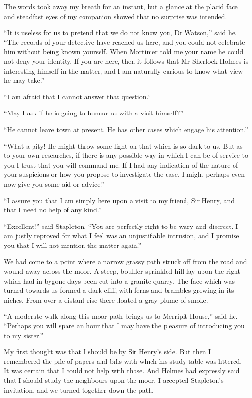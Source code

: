 \documentclass[paper=5.5in:8.5in,BCOR=7mm,twoside,DIV=calc,12pt,usegeometry,openany,chapterprefix,endperiod]{scrbook} %
\begin{document}
The words took away my breath for an instant, but a glance at the placid face and steadfast eyes of my companion showed that no surprise was intended.

\enquote{It is useless for us to pretend that we do not know you, Dr Watson,} said he. \enquote{The records of your detective have reached us here, and you could not celebrate him without being known yourself. When Mortimer told me your name he could not deny your identity. If you are here, then it follows that Mr Sherlock Holmes is interesting himself in the matter, and I am naturally curious to know what view he may take.}

\enquote{I am afraid that I cannot answer that question.}

\enquote{May I ask if he is going to honour us with a visit himself?}

\enquote{He cannot leave town at present. He has other cases which engage his attention.}

\enquote{What a pity! He might throw some light on that which is so dark to us. But as to your own researches, if there is any possible way in which I can be of service to you I trust that you will command me. If I had any indication of the nature of your suspicions or how you propose to investigate the case, I might perhaps even now give you some aid or advice.}

\enquote{I assure you that I am simply here upon a visit to my friend, Sir Henry, and that I need no help of any kind.}

\enquote{Excellent!} said Stapleton. \enquote{You are perfectly right to be wary and discreet. I am justly reproved for what I feel was an unjustifiable intrusion, and I promise you that I will not mention the matter again.}

We had come to a point where a narrow grassy path struck off from the road and wound away across the moor. A steep, boulder-sprinkled hill lay upon the right which had in bygone days been cut into a granite quarry. The face which was turned towards us formed a dark cliff, with ferns and brambles growing in its niches. From over a distant rise there floated a gray plume of smoke.

\enquote{A moderate walk along this moor-path brings us to Merripit House,} said he. \enquote{Perhaps you will spare an hour that I may have the pleasure of introducing you to my sister.}

My first thought was that I should be by Sir Henry's side. But then I remembered the pile of papers and bills with which his study table was littered. It was certain that I could not help with those. And Holmes had expressly said that I should study the neighbours upon the moor. I accepted Stapleton's invitation, and we turned together down the path.
\end{document}
